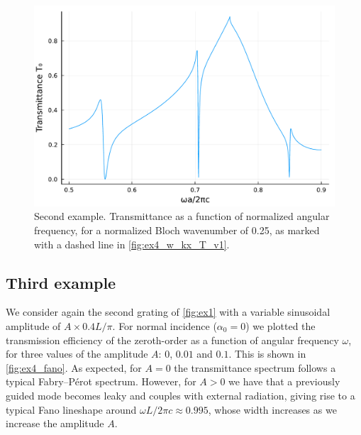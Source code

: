 \documentclass[reprint,amsmath,amssymb,
 aps]{revtex4-2}
\begin{document}
\begin{figure}[h!]
\includegraphics[width=0.6\columnwidth]{figures/ex4_w_singlekx_T.pdf}
\caption{Second example. Transmittance as a function of normalized angular frequency, for a normalized Bloch wavenumber of 0.25, as marked with a dashed line in \cref{fig:ex4_w_kx_T_v1}.}
\label{fig:ex4_w_singlekx_T}
\end{figure}

\subsection{Third example}
We consider again the second grating of \cref{fig:ex1} with a variable sinusoidal amplitude of $A\times 0.4L/\pi$. For normal incidence ($\alpha_0 = 0$) we plotted the transmission efficiency of the zeroth-order as a function of angular frequency $\omega$, for three values of the amplitude $A$: $0$, $0.01$ and $0.1$. This is shown in \cref{fig:ex4_fano}. As expected, for $A=0$ the transmittance spectrum follows a typical Fabry–Pérot spectrum. However, for $A>0$ we have that a previously guided mode becomes leaky and couples with external radiation, giving rise to a typical Fano lineshape around $\omega L /2\pi c \approx 0.995$, whose width increases as we increase the amplitude $A$.
\end{document}
